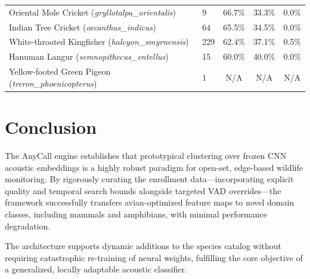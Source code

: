 \documentclass[11pt]{article}
\begin{document}
\begin{longtable}{llccc}
Oriental Mole Cricket (\textit{gryllotalpa\_orientalis}) & 9 & 66.7\% & 33.3\% & 0.0\% \\
Indian Tree Cricket (\textit{oecanthus\_indicus}) & 64 & 65.5\% & 34.5\% & 0.0\% \\
White-throated Kingfisher (\textit{halcyon\_smyrnensis}) & 229 & 62.4\% & 37.1\% & 0.5\% \\
Hanuman Langur (\textit{semnopithecus\_entellus}) & 15 & 60.0\% & 40.0\% & 0.0\% \\
Yellow-footed Green Pigeon (\textit{treron\_phoenicopterus}) & 1 & N/A & N/A & N/A \\
\end{longtable}

\section{Conclusion}
The AnyCall engine establishes that prototypical clustering over frozen CNN acoustic embeddings is a highly robust paradigm for open-set, edge-based wildlife monitoring. By rigorously curating the enrollment data---incorporating explicit quality and temporal search bounds alongside targeted VAD overrides---the framework successfully transfers avian-optimized feature maps to novel domain classes, including mammals and amphibians, with minimal performance degradation. 

The architecture supports dynamic additions to the species catalog without requiring catastrophic re-training of neural weights, fulfilling the core objective of a generalized, locally adaptable acoustic classifier.
\end{document}
